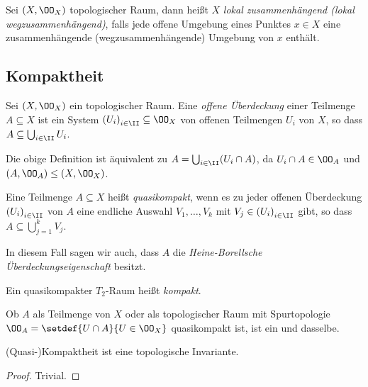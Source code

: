 \begin{defn}
\label{defn:2.2.28}
Sei $(X,\OO_X)$ topologischer Raum, dann heißt $X$ \emph{lokal zusammenhängend
(lokal wegzusammenhängend)}, falls jede offene Umgebung eines Punktes $x\in X$
eine zusammenhängende (wegzusammenhängende) Umgebung von $x$ enthält.\fishhere
\end{defn}

\subsection{Kompaktheit}

\begin{defn}
\label{defn:2.3.1}
Sei $(X,\OO_X)$ ein topologischer Raum. Eine \emph{offene Überdeckung}
einer Teilmenge $A\subseteq X$ ist ein System $\left(U_i\right)_{i\in\II}\subseteq \OO_X$ von offenen Teilmengen $U_i$ von
$X$, so dass $A\subseteq \bigcup_{i\in\II} U_i$.\fishhere
\end{defn}

\begin{bemn}
Die obige Definition ist äquivalent zu $A=\bigcup_{i\in\II} (U_i\cap A)$, da
$U_i\cap A\in\OO_A$ und $(A,\OO_A)\le (X,\OO_X)$.\maphere
\end{bemn}

\begin{defn}
\label{defn:2.3.2}
Eine Teilmenge $A\subseteq X$ heißt \emph{quasikompakt}, wenn es zu jeder
offenen Überdeckung $\left(U_i\right)_{i\in\II}$ von $A$ eine endliche Auswahl
$V_1,\ldots,V_k$ mit $V_j\in\left(U_i\right)_{i\in\II}$ gibt, so dass
$A\subseteq\bigcup_{j=1}^k V_j$.

In diesem Fall sagen wir auch, dass $A$ die \emph{Heine-Borellsche
Überdeckungseigenschaft} besitzt.

Ein quasikompakter $T_2$-Raum heißt \emph{kompakt}.\fishhere
\end{defn}

\begin{bemn}
Ob $A$ als Teilmenge von $X$ oder als topologischer Raum mit Spurtopologie
$\OO_A = \setdef{U\cap A}{U\in\OO_X}$ quasikompakt ist, ist ein und
dasselbe.\maphere
\end{bemn}

\begin{prop}
\label{prop:2.3.3}
(Quasi-)Kompaktheit ist eine topologische Invariante.\fishhere
\end{prop}
\begin{proof}
Trivial.\qedhere
\end{proof}

